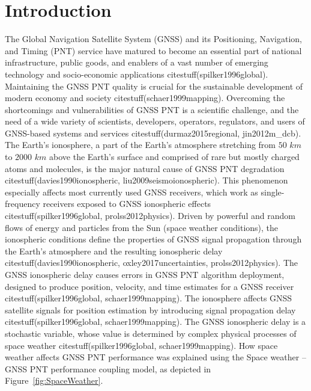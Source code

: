 \let\LaTeXcline\cline\documentclass[sn-mathphys-num]{sn-jnl}\let\cline\LaTeXcline
\begin{document}



\maketitle

\section{Introduction}

The Global Navigation Satellite System (GNSS) and its Positioning, Navigation, and Timing (PNT) service have matured to become an essential part of national infrastructure, public goods, and enablers of a vast number of emerging technology and socio-economic applications citestuff(spilker1996global). Maintaining the GNSS PNT quality is crucial for the sustainable development of modern economy and society citestuff(schaer1999mapping). Overcoming the shortcomings and vulnerabilities of GNSS PNT is a scientific challenge, and the need of a wide variety of scientists, developers, operators, regulators, and users of GNSS-based systems and services citestuff(durmaz2015regional, jin2012m_dcb). The Earth’s ionosphere, a part of the Earth’s atmosphere stretching from $50$ $km$ to $2000$ $km$ above the Earth’s surface and comprised of rare but mostly charged atoms and molecules, is the major natural cause of GNSS PNT degradation citestuff(davies1990ionospheric, liu2009seismoionospheric). This phenomenon especially affects most currently used GNSS receivers, which work as single-frequency receivers exposed to GNSS ionospheric effects citestuff(spilker1996global, prolss2012physics). Driven by powerful and random flows of energy and particles from the Sun (space weather conditions), the ionospheric conditions define the properties of GNSS signal propagation through the Earth’s atmosphere and the resulting ionospheric delay citestuff(davies1990ionospheric, oxley2017uncertainties, prolss2012physics). The GNSS ionospheric delay causes errors in GNSS PNT algorithm deployment, designed to produce position, velocity, and time estimates for a GNSS receiver citestuff(spilker1996global, schaer1999mapping). The ionosphere affects GNSS satellite signals for position estimation by introducing signal propagation delay citestuff(spilker1996global, schaer1999mapping). The GNSS ionospheric delay is a stochastic variable, whose value is determined by complex physical processes of space weather citestuff(spilker1996global, schaer1999mapping). How space weather affects GNSS PNT performance was explained using the Space weather – GNSS PNT performance coupling model, as depicted in Figure~\ref{fig:SpaceWeather}.
\end{document}
